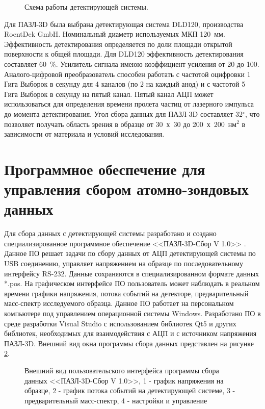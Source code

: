 \begin{figure}[htb]
	\caption{Схема работы детектирующей системы. }
	\label{fig:APPLE_detectionsystem}
\end{figure}

Для ПАЗЛ-3D была выбрана детектирующая система DLD120, производства RoentDek GmbH. Номинальный диаметр используемых МКП 120~мм. Эффективность детектирования определяется по доли площади открытой поверхности к общей площади. Для DLD120 эффективность детектирования составляет 60~\%. Усилитель сигнала имеюю коэффициент усиления от 20 до 100. Аналого-цифровой преобразователь способен работать с частотой оцифровки 1 Гига Выборок в секунду для 4 каналов (по 2 на каждый анод) и с частотой 5 Гига Выборок в секунду на пятый канал. Пятый канал АЦП может использоваться для определения времени пролета частиц от лазерного импульса до момента детектирования. Угол сбора данных для ПАЗЛ-3D составляет 32$^{\circ}$, что позволяет получать область зрения в образце от 30~х~30 до 200~х~200~нм$^{2}$ в зависимости от материала и условий исследования.

\FloatBarrier

\section{Программное обеспечение для управления сбором атомно-зондовых данных}\label{sec:ch2/sec5}

Для сбора данных с детектирующей системы разработано и создано специализированное программное обеспечение <<ПАЗЛ-3D-Сбор V 1.0>> \cite{SBOR}. Данное ПО решает задачи по сбору данных от АЦП детектирующей системы по USB соединению, управляет напряжением на образце по последовательному интерфейсу RS-232. Данные сохраняются в специализированном формате данных *.pos. На графическом интерфейсе ПО пользователь может наблюдать в реальном времени графики напряжения, потока событий на детекторе, предварительный масс-спектр исследуемого образца. Данное ПО работает на персональном компьютере под управлением операционной системы Windows. Разработано ПО в среде разработки Visual Studio с использованием библиотек Qt5 и других библиотек, необходимых для взаимодействия с АЦП и с источником напряжения ПАЗЛ-3D. Внешний вид окна программы сбора данных представлен на рисунке \cref{fig:APPLE_sbor}.

\begin{figure}[htb]
	\caption{Внешний вид пользовательского интерфейса программы сбора данных  <<ПАЗЛ-3D-Сбор V 1.0>>, 1 - график напряжения на образце, 2 - график потока событий на детектирующей системе, 3 - предварительный масс-спектр, 4 - настройки и управление}
	\label{fig:APPLE_sbor}
\end{figure}


